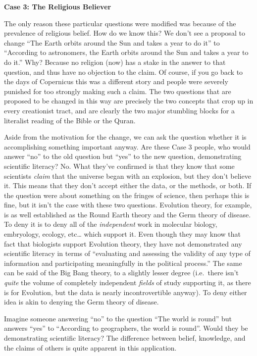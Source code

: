 {\textbf{Case 3: The Religious Believer}}

The only reason these particular questions were modified was because of
the prevalence of religious belief. How do we know this? We don't see a
proposal to change ``The Earth orbits around the Sun and takes a year to
do it'' to ``According to astronomers, the Earth orbits around the Sun
and takes a year to do it.'' Why? Because no religion (now) has a stake
in the answer to that question, and thus have no objection to the claim.
Of course, if you go back to the days of Copernicus this was a different
story and people were severely punished for too strongly making such a
claim. The two questions that are proposed to be changed in this way are
precisely the two concepts that crop up in every creationist tract, and
are clearly the two major stumbling blocks for a literalist reading of
the Bible or the Quran.

Aside from the motivation for the change, we can ask the question
whether it is accomplishing something important anyway. Are these Case 3
people, who would answer ``no'' to the old question but ``yes'' to the
new question, demonstrating scientific literacy?  No.  What they've confirmed is that they know that some scientists \emph{claim}
that the universe began with an explosion, but they don't believe it.
This means that they don't accept either the data, or the methods, or both. If
the question were about something on the fringes of science, then
perhaps this is fine, but it isn't the case with these two questions.
Evolution theory, for example, is as well established as the Round Earth
theory and the Germ theory of disease. To deny it is to deny all of the
\emph{independent} work in molecular biology, embryology, ecology,
etc\ldots{} which support it. Even though they may know that fact that
biologists support Evolution theory, they have not demonstrated any
scientific literacy in terms of ``evaluating and assessing the validity
of any type of information and participating meaningfully in the
political process.'' The same can be said of the Big Bang theory, to a
slightly lesser degree (i.e.~there isn't \emph{quite} the volume of
completely independent \emph{fields} of study supporting it, as there is
for Evolution, but the data is nearly incontrovertible anyway). To deny
either idea is akin to denying the Germ theory of disease.

Imagine someone answering ``no'' to the question ``The world is round''
but answers ``yes'' to ``According to geographers, the world is round''.
Would they be demonstrating scientific literacy?  The difference between belief, knowledge, and the claims of others is quite apparent in this application.


